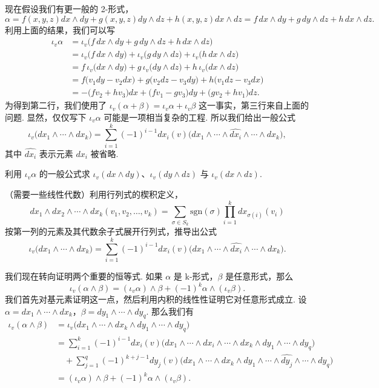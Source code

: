 现在假设我们有更一般的 2-形式，
\[
\alpha=f(x,y,z)dx\wedge dy+g(x,y,z)dy\wedge dz+h(x,y,z)dx\wedge dz
=f\,dx\wedge dy+g\,dy\wedge dz+h\,dx\wedge dz.
\]
利用上面的结果，我们可以写
\begin{align*}
\iota_v\alpha&=\iota_v\bigl(f\,dx\wedge dy+g\,dy\wedge dz+h\,dx\wedge dz\bigr)\\
&=\iota_v\bigl(f\,dx\wedge dy\bigr)+\iota_v\bigl(g\,dy\wedge dz\bigr)+\iota_v\bigl(h\,dx\wedge dz\bigr)\\
&=f\,\iota_v\bigl(dx\wedge dy\bigr)+g\,\iota_v\bigl(dy\wedge dz\bigr)+h\,\iota_v\bigl(dx\wedge dz\bigr)\\
&=f\bigl(v_1dy-v_2dx\bigr)+g\bigl(v_2dz-v_3dy\bigr)+h\bigl(v_1dz-v_3dx\bigr)\\
&=-\bigl(fv_2+hv_3\bigr)dx+\bigl(fv_1-gv_3\bigr)dy+\bigl(gv_2+hv_1\bigr)dz.
\end{align*}
为得到第二行，我们使用了 $\iota_v(\alpha+\beta)=\iota_v\alpha+\iota_v\beta$ 这一事实，第三行来自上面的问题. 显然，仅仅写下 $\iota_v\alpha$ 可能是一项相当复杂的工程. 所以我们给出一般公式
\[
\iota_v\bigl(dx_1\wedge\cdots\wedge dx_k\bigr)
=\sum_{i=1}^{k}(-1)^{i-1}dx_i(v)\bigl(dx_1\wedge\cdots\wedge\widehat{dx_i}\wedge\cdots\wedge dx_k\bigr),
\]
其中 $\widehat{dx_i}$ 表示元素 $dx_i$ 被省略.

\begin{question}\label{q:3-23}
利用 $\iota_v\alpha$ 的一般公式求 $\iota_v(dx\wedge dy)$、$\iota_v(dy\wedge dz)$ 与 $\iota_v(dx\wedge dz)$.
\end{question}

\begin{question}\label{q:3-24}
（需要一些线性代数）利用行列式的楔积定义，
\[
dx_1\wedge dx_2\wedge\cdots\wedge dx_k(v_1,v_2,\ldots,v_k)
=\sum_{\sigma\in S_k}\mathrm{sgn}(\sigma)\prod_{i=1}^{k}dx_{\sigma(i)}(v_i)
\]
按第一列的元素及其代数余子式展开行列式，推导出公式
\[
\iota_v\bigl(dx_1\wedge\cdots\wedge dx_k\bigr)
=\sum_{i=1}^{k}(-1)^{i-1}dx_i(v)\bigl(dx_1\wedge\cdots\wedge\widehat{dx_i}\wedge\cdots\wedge dx_k\bigr).
\]
\end{question}

我们现在转向证明两个重要的恒等式. 如果 $\alpha$ 是 k-形式，$\beta$ 是任意形式，那么
\[
\iota_v(\alpha\wedge\beta)=(\iota_v\alpha)\wedge\beta+(-1)^k\alpha\wedge(\iota_v\beta).
\]
我们首先对基元素证明这一点，然后利用内积的线性性证明它对任意形式成立. 设 $\alpha=dx_1\wedge\cdots\wedge dx_k$，$\beta=dy_1\wedge\cdots\wedge dy_q$. 那么我们有
\begin{align*}
\iota_v(\alpha\wedge\beta)&=\iota_v\bigl(dx_1\wedge\cdots\wedge dx_k\wedge dy_1\wedge\cdots\wedge dy_q\bigr)\\
&=\sum_{i=1}^{k}(-1)^{i-1}dx_i(v)\bigl(dx_1\wedge\cdots\wedge\widehat{dx_i}\wedge\cdots\wedge dx_k\wedge dy_1\wedge\cdots\wedge dy_q\bigr)\\
&\quad+\sum_{j=1}^{q}(-1)^{k+j-1}dy_j(v)\bigl(dx_1\wedge\cdots\wedge dx_k\wedge dy_1\wedge\cdots\wedge\widehat{dy_j}\wedge\cdots\wedge dy_q\bigr)\\
&=(\iota_v\alpha)\wedge\beta+(-1)^k\alpha\wedge(\iota_v\beta).
\end{align*}

